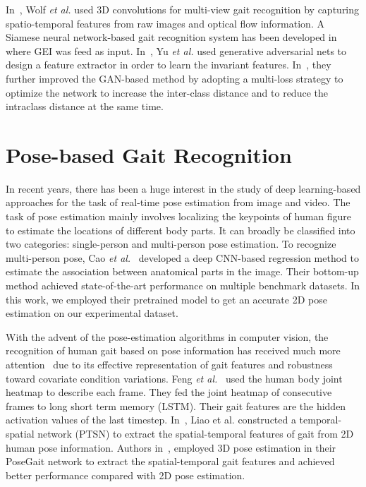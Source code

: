 In~\cite{Wolf_16}, Wolf \textit{et al.} used 3D convolutions for multi-view gait recognition by capturing spatio-temporal features from raw images and optical flow information. A Siamese neural network-based gait recognition system has been developed in~\cite{Zhang_16} where GEI was feed as input. In~\cite{Yu_17}, Yu \textit{et al.} used generative adversarial nets to design a feature extractor in order to learn the invariant features. In~\cite{Yu_19}, they further improved the GAN-based method by adopting a multi-loss strategy to optimize the network to increase the inter-class distance and to reduce the intraclass distance at the same time.


\section{Pose-based Gait Recognition}
In recent years, there has been a huge interest in the study of deep learning-based approaches for the task of real-time pose estimation from image and video. The task of pose estimation mainly involves localizing the keypoints of human figure to estimate the locations of different body parts. It can broadly be classified into two categories: single-person and multi-person pose estimation. To recognize multi-person pose, Cao \textit{et al.}~\cite{Cao_19} developed a deep CNN-based regression method to estimate the association between anatomical parts in the image. Their bottom-up method achieved state-of-the-art performance on multiple benchmark datasets. In this work, we employed their pretrained model to get an accurate 2D pose estimation on our experimental dataset.

With the advent of the pose-estimation algorithms in computer vision, the recognition of human gait based on pose information has received much more attention~\cite{Feng_16, Liao_17, Liao_19} due to its effective representation of gait features and robustness toward covariate condition variations. Feng \textit{et al.}~\cite{Feng_16} used the human body joint heatmap to describe each frame. They fed the joint heatmap of consecutive frames to long short term memory (LSTM). Their gait features are the hidden activation values of the last timestep. In~\cite{Liao_17}, Liao et al. constructed a temporal-spatial network (PTSN) to extract the spatial-temporal features of gait from 2D human pose information. Authors in~\cite{Liao_19}, employed 3D pose estimation in their PoseGait network to extract the spatial-temporal gait features and achieved better performance compared with 2D pose estimation.

